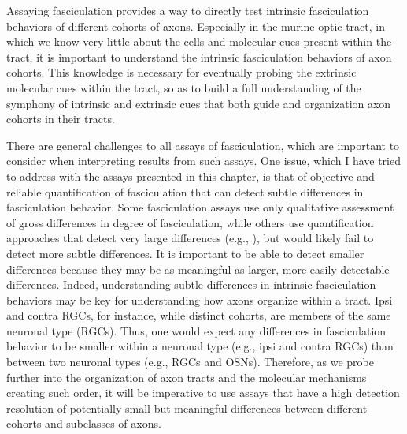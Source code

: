Assaying fasciculation \invitro{} provides a way to directly test intrinsic fasciculation behaviors of different cohorts of axons.
Especially in the murine optic tract, in which we know very little about the cells and molecular cues present within the tract, it is important to understand the intrinsic fasciculation behaviors of axon cohorts.
This knowledge is necessary for eventually probing the extrinsic molecular cues within the tract, so as to build a full understanding of the symphony of intrinsic and extrinsic cues that both guide and organization axon cohorts in their tracts.

There are general challenges to all \invitro{} assays of fasciculation, which are important to consider when interpreting results from such assays.
One issue, which I have tried to address with the assays presented in this chapter, is that of objective and reliable quantification of fasciculation that can detect subtle differences in fasciculation behavior.
Some fasciculation assays use only qualitative assessment of gross differences in degree of fasciculation, while others use quantification approaches that detect very large differences (e.g., ), but would likely fail to detect more subtle differences.
It is important to be able to detect smaller differences because they may be as meaningful as larger, more easily detectable differences.
Indeed, understanding subtle differences in intrinsic fasciculation behaviors may be key for understanding how axons organize within a tract.
Ipsi and contra RGCs, for instance, while distinct cohorts, are members of the same neuronal type (RGCs).
Thus, one would expect any differences in fasciculation behavior to be smaller within a neuronal type (e.g., ipsi and contra RGCs) than between two neuronal types (e.g., RGCs and OSNs).
Therefore, as we probe further into the organization of axon tracts and the molecular mechanisms creating such order, it will be imperative to use assays that have a high detection resolution of potentially small but meaningful differences between different cohorts and subclasses of axons.

